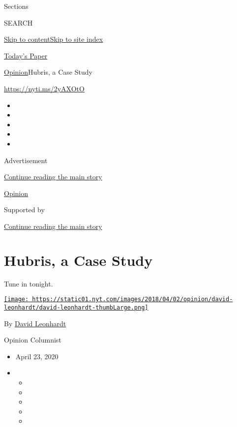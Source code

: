 Sections

SEARCH

\protect\hyperlink{site-content}{Skip to
content}\protect\hyperlink{site-index}{Skip to site index}

\href{https://myaccount.nytimes.com/auth/login?response_type=cookie\&client_id=vi}{}

\href{https://www.nytimes.com/section/todayspaper}{Today's Paper}

\href{/section/opinion}{Opinion}\textbar{}Hubris, a Case Study

\href{https://nyti.ms/2yAXOtO}{https://nyti.ms/2yAXOtO}

\begin{itemize}
\item
\item
\item
\item
\item
\end{itemize}

Advertisement

\protect\hyperlink{after-top}{Continue reading the main story}

\href{/section/opinion}{Opinion}

Supported by

\protect\hyperlink{after-sponsor}{Continue reading the main story}

\hypertarget{hubris-a-case-study}{%
\section{Hubris, a Case Study}\label{hubris-a-case-study}}

Tune in tonight.

\href{https://www.nytimes.com/by/david-leonhardt}{\texttt{[image: https://static01.nyt.com/images/2018/04/02/opinion/david-leonhardt/david-leonhardt-thumbLarge.png]}}

By \href{https://www.nytimes.com/by/david-leonhardt}{David Leonhardt}

Opinion Columnist

\begin{itemize}
\item
  April 23, 2020
\item
  \begin{itemize}
  \item
  \item
  \item
  \item
  \item
  \end{itemize}
\end{itemize}

